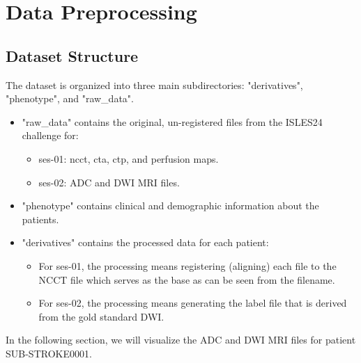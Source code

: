 \chapter{Data Preprocessing}
\label{ch:data_preprocessing}

%
%
\section{Dataset Structure}
\label{subsec:dataset_structure}
The dataset is organized into three main subdirectories: "derivatives", "phenotype", and "raw\_data". 
\begin{itemize}
    \item "raw\_data" contains the original, un-registered files from the ISLES24 challenge for:
      \begin{itemize}
        \item ses-01: ncct, cta, ctp, and perfusion maps.
        \item ses-02: ADC and DWI MRI files.
      \end{itemize}
    \item "phenotype" contains clinical and demographic information about the patients.
    \item "derivatives" contains the processed data for each patient:
      \begin{itemize}
        \item For ses-01, the processing means registering (aligning) each file to the NCCT file which serves as the base as can be seen from the filename.
        \item For ses-02, the processing means generating the label file that is derived from the gold standard DWI.
      \end{itemize}
\end{itemize}

In the following section, we will visualize the ADC and DWI MRI files for patient SUB-STROKE0001.

